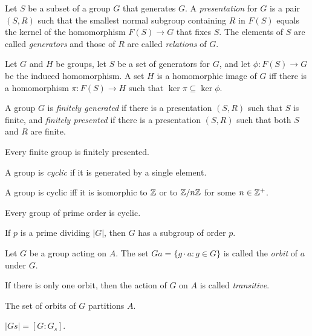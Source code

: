 \begin{defn}
    Let $S$ be a subset of a group $G$ that generates $G$. A \emph{presentation}
    for $G$ is a pair $(S,R)$ such that the smallest normal subgroup containing
    $R$ in $F(S)$ equals the kernel of the homomorphism $F(S)\to G$ that fixes
    $S$. The
    elements of $S$ are called \emph{generators} and those of $R$ are called
    \emph{relations} of $G$.
\end{defn}
\begin{prop}
    Let $G$ and $H$ be groups, let $S$ be a set of generators for $G$, and let
    $\phi:F(S)\to G$ be the induced homomorphism. A set $H$ is a homomorphic
    image of $G$ iff there is a homomorphism $\pi:F(S)\to H$ such that
    $\ker\pi\subseteq\ker\phi$.
\end{prop}
\begin{defn}
    A group $G$ is \emph{finitely generated} if there is a presentation $(S,R)$
    such that $S$ is finite, and \emph{finitely presented} if there is a
    presentation $(S,R)$ such that both $S$ and $R$ are finite.
\end{defn}
\begin{prop}
    Every finite group is finitely presented.
\end{prop}
\begin{defn}
    A group is \emph{cyclic} if it is generated by a single element.
\end{defn}
\begin{prop}
    A group is cyclic iff it is isomorphic to $\mathbb{Z}$ or to $\mathbb{Z}/n\mathbb{Z}$ for some
    $n\in\mathbb{Z}^+$.
\end{prop}
\begin{prop}
    Every group of prime order is cyclic.
\end{prop}
\begin{thm}[Cauchy]
    If $p$ is a prime dividing $|G|$, then $G$ has a subgroup of order $p$.
\end{thm}
\begin{defn}
    Let $G$ be a group acting on $A$.
    The set $Ga=\{g\cdot a:g\in G\}$ is called the \emph{orbit} of $a$ under $G$.

    If there is only one orbit, then the action of $G$ on $A$ is called
    \emph{transitive}.
\end{defn}
\begin{prop}
    The set of orbits of $G$ partitions $A$.
\end{prop}
\begin{prop}
    $|Gs|=[G:G_s]$.
\end{prop}
